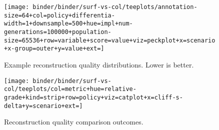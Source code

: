 \begin{figure*}
  \centering
  \begin{subfigure}[b]{0.5\textwidth}
    \centering
    \texttt{[image: binder/binder/surf-vs-col/teeplots/annotation-size=64+col=policy+differentia-width=1+downsample=500+hue=impl+num-generations=100000+population-size=65536+row=variable+score=value+viz=peckplot+x=scenario+x-group=outer+y=value+ext=]}
    \caption{Example reconstruction quality distributions. Lower is better.}
    \label{fig:col-vs-surf-example}
  \end{subfigure}%
  \begin{subfigure}[b]{0.5\textwidth}
    \centering
    \texttt{[image: binder/binder/surf-vs-col/teeplots/col=metric+hue=relative-grade+kind=strip+row=policy+viz=catplot+x=cliff-s-delta+y=scenario+ext=]}
    \caption{Reconstruction quality comparison outcomes.}
  \label{fig:col-vs-surf-overview}
  \end{subfigure}
  \caption{%
    \textbf{Does column- or surface-based instrumentation give higher-quality reconstruction?}
    \footnotesize
    Subpanel \ref{fig:col-vs-surf-overview} shows effect sizes of column-vs-surface comparisons for triplet distance and inner node loss metrics across sensitivity analysis conditions.
    Color coding indicates a significant outcome (Mann-Whitney U).
    Surface tends to outperform column under tilted policy and vice versa under steady policy.
    Subpanel \ref{fig:col-vs-surf-example} shows reconstruction quality effects for 64-bit size, bit-differentia annotations with population size 65,536, downsample size 500, and 100k generations.
    Background hatching indicates significant outcome.
    See Supplementary Figure \ref{fig:col-vs-surf} for listing of effects by sensitivity analysis condition \citep{moreno2024supplemental}.
  }
  \label{fig:col-vs-surf-summary}
\end{figure*}
